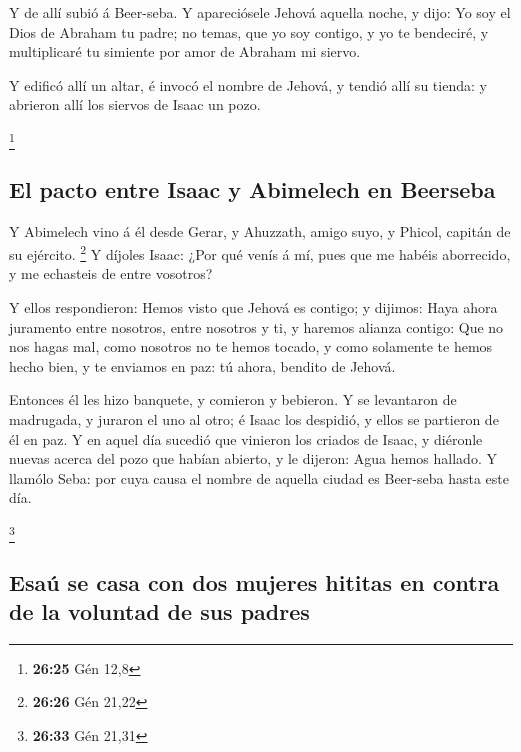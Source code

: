  Y de allí subió á Beer-seba.  Y apareciósele
Jehová aquella noche, y dijo: Yo soy el Dios de Abraham tu padre; no
temas, que yo soy contigo, y yo te bendeciré, y multiplicaré tu simiente
por amor de Abraham mi siervo.

 Y edificó allí un altar, é invocó el nombre de Jehová, y
tendió allí su tienda: y abrieron allí los siervos de Isaac un pozo.

\footnote{\textbf{26:25} Gén 12,8}

\hypertarget{el-pacto-entre-isaac-y-abimelech-en-beerseba}{%
\subsection{El pacto entre Isaac y Abimelech en
Beerseba}\label{el-pacto-entre-isaac-y-abimelech-en-beerseba}}

 Y Abimelech vino á él desde Gerar, y Ahuzzath, amigo suyo,
y Phicol, capitán de su ejército. \footnote{\textbf{26:26} Gén 21,22}
 Y díjoles Isaac: ¿Por qué venís á mí, pues que me habéis
aborrecido, y me echasteis de entre vosotros?

 Y ellos respondieron: Hemos visto que Jehová es contigo; y
dijimos: Haya ahora juramento entre nosotros, entre nosotros y ti, y
haremos alianza contigo:  Que no nos hagas mal, como
nosotros no te hemos tocado, y como solamente te hemos hecho bien, y te
enviamos en paz: tú ahora, bendito de Jehová.

 Entonces él les hizo banquete, y comieron y bebieron.
 Y se levantaron de madrugada, y juraron el uno al otro; é
Isaac los despidió, y ellos se partieron de él en paz.  Y
en aquel día sucedió que vinieron los criados de Isaac, y diéronle
nuevas acerca del pozo que habían abierto, y le dijeron: Agua hemos
hallado.  Y llamólo Seba: por cuya causa el nombre de
aquella ciudad es Beer-seba hasta este día.

\footnote{\textbf{26:33} Gén 21,31}

\hypertarget{esauxfa-se-casa-con-dos-mujeres-hititas-en-contra-de-la-voluntad-de-sus-padres}{%
\subsection{Esaú se casa con dos mujeres hititas en contra de la
voluntad de sus
padres}\label{esauxfa-se-casa-con-dos-mujeres-hititas-en-contra-de-la-voluntad-de-sus-padres}}

